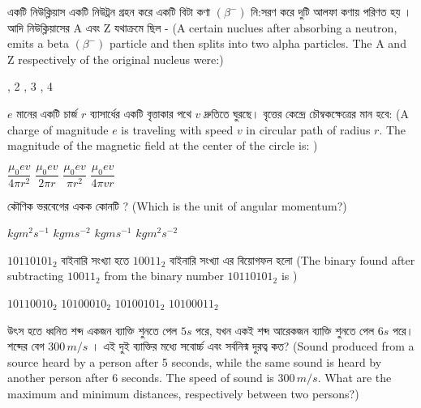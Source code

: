 \documentclass[addpoints]{exam}
\begin{document}
\begin{questions}
\question  একটি নিউক্লিয়াস একটি নিউট্রন গ্রহন করে একটি বিটা কণা $ (\beta^{-})  $ নি:সরণ করে  দুটি আলফা কণায় পরিণত হয় । আদি নিউক্লিয়াসের A এবং Z যথাক্রমে ছিল - (A certain nuclues after absorbing a neutron, emits a beta $ (\beta^{-})  $ particle and then splits into two alpha particles. The A and Z respectively of the original nucleus were:)

\begin{oneparchoices}
, 2
, 3
, 4
\end{oneparchoices}

\question  $ e $ মানের একটি চার্জ $ r $ ব্যাসার্ধের একটি বৃত্তাকার পথে $ v $ দ্রুতিতে ঘুরছে। বৃত্তের কেন্দ্রে চৌম্বকক্ষেত্রের মান হবে:  (A charge of magnitude $ e $ is traveling with speed $ v $ in circular path of radius $ r $. The magnitude of the magnetic field at the center of the circle is: )

\begin{oneparchoices}
\choice  $\dfrac{\mu_{0}ev}{4\pi r^{2}}$
\choice  $\dfrac{\mu_{0}ev}{2\pi r}$
\choice  $\dfrac{\mu_{0}ev}{\pi r^{2}}$
\choice  $\dfrac{\mu_{0}ev}{4\pi v r}$
\end{oneparchoices}

\question  কৌণিক ভরবেগের একক কোনটি ? (Which is the unit of angular momentum?)

\begin{oneparchoices}
\choice $ kgm^{2}s^{-1} $
\choice $ kgms^{-2} $
\choice $ kgms^{-1} $
\choice $ kgm^{2}s^{-2} $

\end{oneparchoices}

\question  $ 10110101_{2} $ বাইনারি সংখ্যা হতে $ 10011_{2} $ বাইনারি সংখ্যা এর বিয়োগফল হলো (The binary found after subtracting $ 10011_{2} $ from the binary number $ 10110101_{2} $ is )

\begin{oneparchoices}
\choice $ 10110010_{2} $
\choice $ 10100010_{2} $
\choice $ 10100101_{2} $
\choice $ 10100011_{2} $

\end{oneparchoices}


\question  উৎস হতে ধ্বনিত শব্দ একজন ব্যাক্তি শুনতে পেল $ 5s $ পরে, যখন একই শব্দ আরেকজন ব্যাক্তি শুনতে পেল $ 6s $ পরে। শব্দের বেগ $ 300\,m/s $ । এই দুই ব্যাক্তির মধ্যে সবোর্চ্চ এবং সর্বনিন্ম দুরত্ব কত? (Sound produced from a source heard by a person after 5 seconds, while the same sound is heard by another person after 6 seconds. The speed of sound is $ 300\,m/s  $. What are the maximum and minimum distances, respectively between two persons?)


\end{questions}
\end{document}
